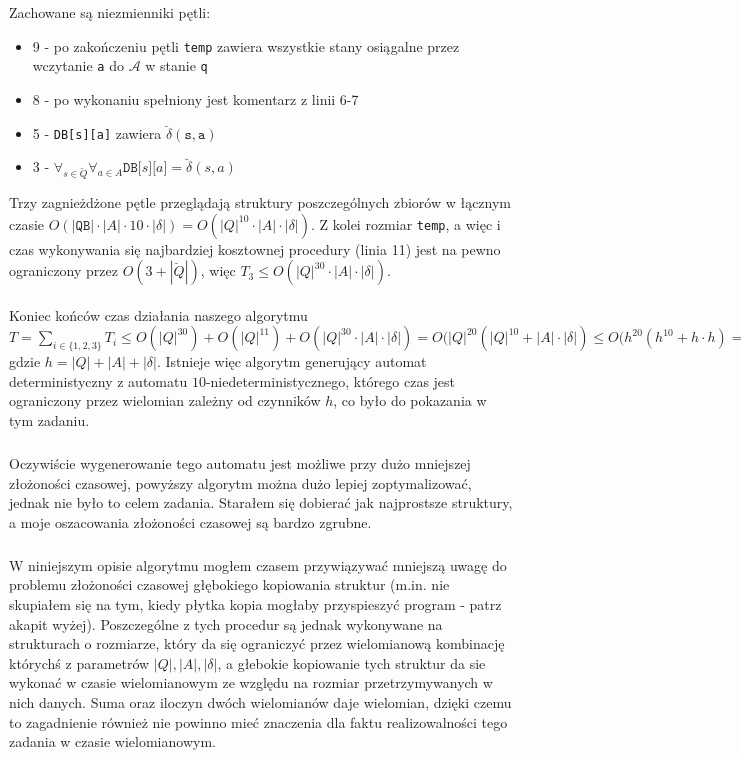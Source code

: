 \documentclass[12pt]{article}
\newcommand*{\Autom}{\mathcal{A}}
\begin{document}
Zachowane są niezmienniki pętli:
\begin{itemize}
  \item 9 - po zakończeniu pętli \texttt{temp} zawiera wszystkie stany osiągalne przez wczytanie \texttt{a}
do $\Autom$ w stanie \texttt{q}
  \item 8 - po wykonaniu spełniony jest komentarz z linii 6-7
  \item 5 - \texttt{DB[s][a]} zawiera $\breve \delta(\texttt{s}, \texttt{a})$
  \item 3 - $\forall_{s \in \breve Q}\forall_{a \in A} \texttt{DB[}s\texttt{][}a\texttt{]} =
	    \breve\delta(s, a)$
\end{itemize}

Trzy zagnieżdżone pętle przeglądają struktury poszczególnych zbiorów w łącznym czasie
$O(|\texttt{QB}| \cdot |A| \cdot 10 \cdot |\delta|) = O(|Q|^{10} \cdot |A| \cdot |\delta|)$.
Z kolei rozmiar \texttt{temp}, a więc i czas wykonywania się najbardziej kosztownej procedury
(linia 11) jest na pewno ograniczony przez $O(3 + |\breve Q|)$, więc $T_3 \leq
O(|Q|^{30} \cdot |A| \cdot |\delta|)$.

\paragraph{}
Koniec końców czas działania naszego algorytmu $T = \sum_{i \in \{1, 2, 3\}}T_i \leq
O(|Q|^{30})+O(|Q|^{11})+O(|Q|^{30} \cdot |A| \cdot |\delta|) =
O(|Q|^{20}(|Q|^{10} + |A| \cdot |\delta|) \leq O(h^{20}(h^{10} + h \cdot h) = O(h^{30})$ gdzie
$h = |Q| + |A| + |\delta|$. Istnieje więc algorytm generujący automat deterministyczny z automatu
$10$-niedeterministycznego, którego czas jest ograniczony przez wielomian zależny od czynników
$h$, co było do pokazania w tym zadaniu.
\subparagraph{}
Oczywiście wygenerowanie tego automatu jest możliwe przy dużo mniejszej złożoności czasowej,
powyższy algorytm można dużo lepiej zoptymalizować, jednak nie było to celem zadania. Starałem się
dobierać jak najprostsze struktury, a moje oszacowania złożoności czasowej są bardzo zgrubne.
\subparagraph{}
W niniejszym opisie algorytmu mogłem czasem przywiązywać mniejszą uwagę do problemu złożoności
czasowej głębokiego kopiowania struktur (m.in. nie skupiałem się na tym, kiedy płytka kopia mogłaby
przyspieszyć program - patrz akapit wyżej). Poszczególne z tych procedur są jednak wykonywane na
strukturach o rozmiarze, który da się ograniczyć przez wielomianową kombinację którychś z
parametrów $|Q|, |A|, |\delta|$, a głebokie kopiowanie tych struktur da sie wykonać w czasie
wielomianowym ze względu na rozmiar przetrzymywanych w nich danych. Suma oraz iloczyn dwóch 
wielomianów daje wielomian, dzięki czemu to zagadnienie również nie powinno mieć znaczenia dla
faktu realizowalności tego zadania w czasie wielomianowym. 

\label{LastPage}
\end{document}
